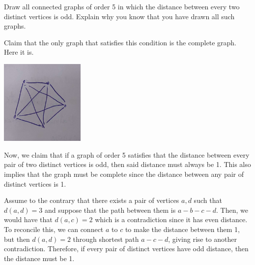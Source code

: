 \question
  Draw all connected graphs of order 5 in which the distance between every two
  distinct vertices is odd. Explain why you know that you have drawn all such 
  graphs.

  \begin{solution}
    Claim that the only graph that satisfies this condition is the complete
    graph. Here it is.

    \begin{center}
      \includegraphics[width=0.31\textwidth]{figures/p1-complete}
    \end{center}

    Now, we claim that if a graph of order 5 satisfies that the distance between
    every pair of two distinct vertices is odd, then said distance must always 
    be 1. This also implies that the graph must be complete since the distance
    between any pair of distinct vertices is 1.

    Assume to the contrary that there exists a pair of vertices \(a, d\) such
    that \(d(a, d) = 3\) and suppose that the path between them is \(a - b - c -
    d\). Then, we would have that \(d(a, c) = 2\) which is a contradiction since
    it has even distance. To reconcile this, we can connect \(a\) to \(c\) to
    make the distance between them 1, but then \(d(a, d) = 2\) through shortest
    path \(a - c - d\), giving rise to another contradiction. Therefore, if 
    every pair of distinct vertices have odd distance, then the distance must
    be 1.
  \end{solution}

